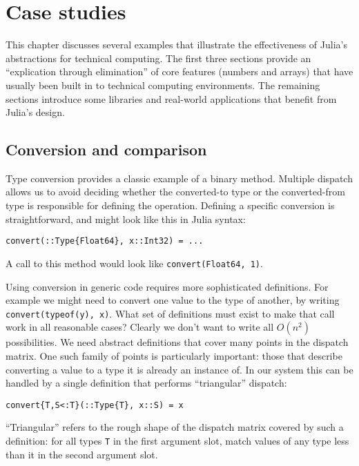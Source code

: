 \chapter{Case studies}
\label{chap:casestudies}

This chapter discusses several examples that illustrate the effectiveness of
Julia's abstractions for technical computing.
The first three sections provide an ``explication through elimination'' of
core features (numbers and arrays) that have usually been built in to
technical computing environments.
The remaining sections introduce some libraries and real-world applications
that benefit from Julia's design.

\section{Conversion and comparison}
\label{sec:conversion}

Type conversion provides a classic example of a binary method.
Multiple dispatch allows us to avoid deciding whether the converted-to type or the
converted-from type is responsible for defining the operation.
Defining a specific conversion is straightforward, and might look like this
in Julia syntax:

\begin{verbatim}
convert(::Type{Float64}, x::Int32) = ...
\end{verbatim}

\noindent
A call to this method would look like \texttt{convert(Float64, 1)}.

Using conversion in generic code requires more sophisticated definitions.
For example we might need to convert one value to the type of another,
by writing \texttt{convert(typeof(y), x)}.
What set of definitions must exist to make that call work in all reasonable cases?
Clearly we don't want to write all $O(n^2)$ possibilities.
We need abstract definitions that cover many points in the dispatch matrix.
One such family of points is particularly important: those that describe converting
a value to a type it is already an instance of.
In our system this can be handled by a single definition that performs ``triangular''
dispatch:

\begin{verbatim}
convert{T,S<:T}(::Type{T}, x::S) = x
\end{verbatim}

\noindent
``Triangular'' refers to the rough shape of the dispatch matrix covered
by such a definition: for all types \texttt{T} in the first argument slot,
match values of any type less than it in the second argument slot.

